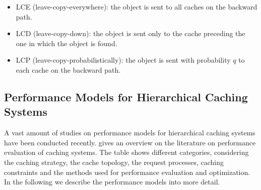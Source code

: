 \begin{itemize}
  \item LCE (leave-copy-everywhere): the object is sent to all caches on the backward path.
  \item LCD (leave-copy-down): the object is sent only to the cache preceding the one in which the object is found.
  \item LCP (leave-copy-probabilistically): the object is sent with probability $q$ to each cache on the backward path.
\end{itemize}

\subsection{Performance Models for Hierarchical Caching Systems}\label{sec:hierarchical:background:models}

A vast amount of studies on performance models for hierarchical caching systems have been conducted recently.
 gives an overview on the literature on performance evaluation of caching systems.
The table shows different categories, considering the caching strategy, the cache topology, the request processes, caching constraints and the methods used for performance evaluation and optimization.
In the following we describe the performance models into more detail.

